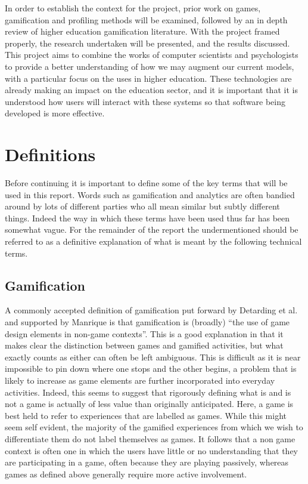 \documentclass[12pt,a4paper,twoside]{report}
\begin{document}
In order to establish the context for the project, prior work on games, gamification and profiling methods will be examined, followed by an in depth review of higher education gamification literature. With the project framed properly, the research undertaken will be presented, and the results discussed. This project aims to combine the works of computer scientists and psychologists to provide a better understanding of how we may augment our current models, with a particular focus on the uses in higher education. These technologies are already making an impact on the education sector, and it is important that it is understood how users will interact with these systems so that software being developed is more effective.

\chapter{Definitions}
\label{sec:define}
Before continuing it is important to define some of the key terms that will be used in this report. Words such as gamification and analytics are often bandied around by lots of different parties who all mean similar but subtly different things. Indeed the way in which these terms have been used thus far has been somewhat vague. For the remainder of the report the undermentioned should be referred to as a definitive explanation of what is meant by the following technical terms.

\section{Gamification}
A commonly accepted definition of gamification put forward by Detarding et al. \cite{deterding2011game} and supported by Manrique \cite{iversitymooc} is that gamification is (broadly) ``the use of game design elements in non-game contexts''. This is a good explanation in that it makes clear the distinction between games and gamified activities, but what exactly counts as either can often be left ambiguous. This is difficult as it is near impossible to pin down where one stops and the other begins, a problem that is likely to increase as game elements are further incorporated into everyday activities. Indeed, this seems to suggest that rigorously defining what is and is not a game is actually of less value than originally anticipated. Here, a game is best held to refer to experiences that are labelled as games. While this might seem self evident, the majority of the gamified experiences from which we wish to differentiate them do not label themselves as games. It follows that a non game context is often one in which the users have little or no understanding that they are participating in a game, often because they are playing passively, whereas games as defined above generally require more active involvement.
\end{document}
